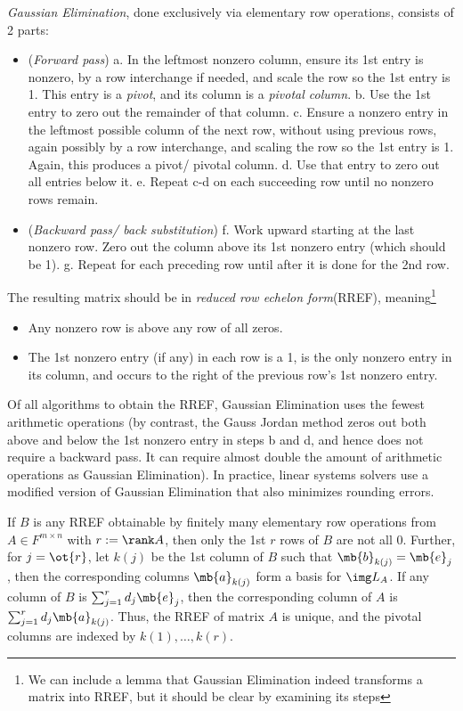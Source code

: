 \begin{defn}
\emph{Gaussian Elimination}, done exclusively via elementary row operations, consists of 2 parts:
\begin{itemize}
\item (\emph{Forward pass}) a. In the leftmost nonzero column, ensure its 1st entry is nonzero, by a row interchange if needed, and scale the row so the 1st entry is 1. This entry is a \emph{pivot}, and its column is a \emph{pivotal column}. b. Use the 1st entry to zero out the remainder of that column. c. Ensure a nonzero entry in the leftmost possible column of the next row, without using previous rows, again possibly by a row interchange, and scaling the row so the 1st entry is 1. Again, this produces a pivot/ pivotal column. d. Use that entry to zero out all entries below it. e. Repeat c-d on each succeeding row until no nonzero rows remain.
\item (\emph{Backward pass/ back substitution}) f. Work upward starting at the last nonzero row. Zero out the column above its 1st nonzero entry (which should be 1). g. Repeat for each preceding row until after it is done for the 2nd row. 
\end{itemize}
The resulting matrix should be in \emph{reduced row echelon form}(RREF), meaning\footnote{We can include a lemma that Gaussian Elimination indeed transforms a matrix into RREF, but it should be clear by examining its steps}
\begin{itemize}
\item Any nonzero row is above any row of all zeros.
\item The 1st nonzero entry (if any) in each row is a 1, is the only nonzero entry in its column, and occurs to the right of the previous row's 1st nonzero entry.
\end{itemize}
\end{defn}
Of all algorithms to obtain the RREF, Gaussian Elimination uses the fewest arithmetic operations (by contrast, the Gauss Jordan method zeros out both above and below the 1st nonzero entry in steps b and d, and hence does not require a backward pass. It can require almost double the amount of arithmetic operations as Gaussian Elimination). In practice, linear systems solvers use a modified version of Gaussian Elimination that also minimizes rounding errors.
\begin{lem}\label{l:rref-unique}
If $B$ is any RREF obtainable by finitely many elementary row operations from $A \in F^{m \times n}$ with $r:= \rank A$, then only the 1st $r$ rows of $B$ are not all 0. Further, for $j=\ot{r}$, let $k(j)$ be the 1st column of $B$ such that $\mb{b}_{k(j)}= \mb{e}_j$, then the corresponding columns $\mb{a}_{k(j)}$ form a basis for $\img L_A$. If any column of $B$ is $\sum_{j=1}^rd_j \mb{e}_j$, then the corresponding column of $A$ is $\sum_{j=1}^rd_j \mb{a}_{k(j)}$.
Thus, the RREF of matrix $A$ is unique, and the pivotal columns are indexed by $k(1), \ldots,k(r)$.
\end{lem}

